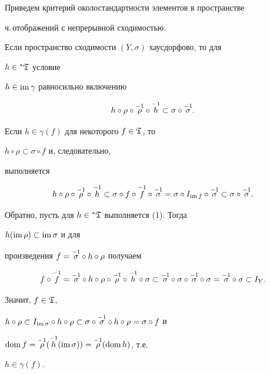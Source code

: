 Приведем критерий околостандартности элементов в пространстве


ч.\,отображений с непрерывной сходимостью.





\begin{thm}


Если пространство сходимости $(Y,\sigma)$ хаусдорфово, то для


$h\in{}^*\frak T$ условие


$h\in\operatorname{im}\gamma$ равносильно включению


\begin{equation}


h\circ \rho\circ \mir \circ \mih \subset\sigma\circ \mis.


\end{equation}


\end{thm}





\begin{pf}


Если $h\in\gamma(f)$ для некоторого $f\in\frak T$, то


$h\circ \rho\subset\sigma\circ f$ и, следовательно,


выполняется


$$


h\circ \rho\circ \mir \circ \mih \subset\sigma\circ f


\circ \mif \circ \mis =\sigma\circ I_{\imm f}\circ \mis


\subset\sigma\circ \mis.


$$


Обратно, пусть для $h\in{}^*\frak T$ выполняется (1). Тогда


$h(\operatorname{im}\rho)\subset\operatorname{im}\sigma$ и для


произведения $f=\overset{-1}{\sigma}{}\circ h\circ \rho$ получаем


$$


f\circ \mif=\mis\circ h\circ \rho\circ \mir\circ \mih \circ \sigma


\subset\mis \circ \sigma\circ \mis \circ \sigma=\mis \circ


\sigma\subset I_Y.


$$


Значит, $f\in\frak T$,


$h\circ \rho\subset I_{\imm\sigma}\circ h\circ \rho\subset


\sigma\circ \mis \circ h\circ \rho=\sigma\circ f$ и


$\operatorname{dom} f=\overset{-1}{\rho}{} (\overset{-1}{h}{} (\operatorname{im}\sigma))=\overset{-1}{\rho}{} (\operatorname{dom} h)$, т.е.


$h\in\gamma(f)$.


\end{pf}





